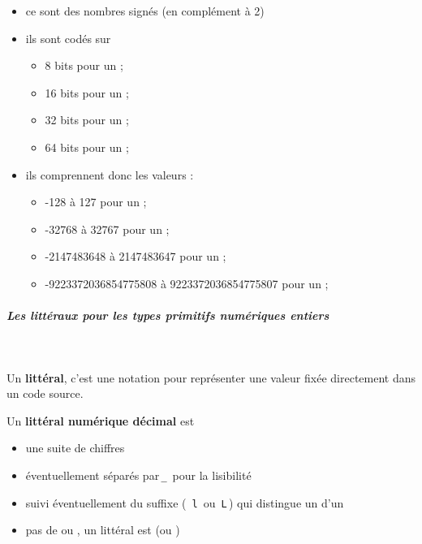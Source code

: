 \documentclass[11pt,a4paper]{article}
\begin{document}
					\begin{itemize}
				
			\item  ce sont des nombres sign\'es (en compl\'ement \`a 2)
			\item  ils sont cod\'es sur 
              
					\begin{itemize}
				
			\item  8 bits pour un \verb@byte@ ;
			\item  16 bits pour un \verb@short@ ;
			\item  32 bits pour un \verb@int@ ;
			\item  64 bits pour un \verb@long@ ;
					\end{itemize}
				
			\item  ils comprennent donc les valeurs :
              
					\begin{itemize}
				
			\item  -128 \`a 127 pour un \verb@byte@ ;
			\item  -32768 \`a 32767 pour un \verb@short@ ;
			\item  -2147483648 \`a 2147483647 pour un \verb@int@ ;
			\item  -9223372036854775808 \`a 9223372036854775807 pour un \verb@long@ ;
					\end{itemize}
				
					\end{itemize}
				
            \par
        
			
		\subparagraph{Les litt\'eraux pour les types primitifs num\'eriques entiers} 
		
					\textcolor{white}{.} \par
				
            \par
        
          Un \textbf{litt\'eral}, c'est une notation pour repr\'esenter une valeur fix\'ee directement dans un code  source.
        
            \par
        
          Un \textbf{litt\'eral num\'erique d\'ecimal} est
            
					\begin{itemize}
				
			\item une suite de chiffres
			\item \'eventuellement s\'epar\'es par\,\verb|_|\, pour la lisibilit\'e
			\item suivi \'eventuellement du suffixe ( \,\verb|l|\, ou \,\verb|L|\,) 
                qui distingue un \verb@int@ d'un \verb@long@
			\item pas de \verb@byte@ ou \verb@short@, 
                un litt\'eral est \verb@int@ (ou \verb@long@)
					\end{itemize}
				
\end{document}
